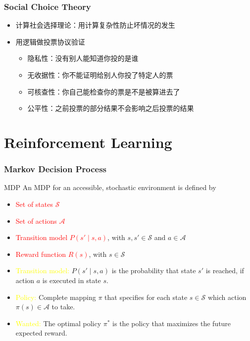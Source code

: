 \documentclass[UTF8,11pt,colorlinks,compress,openany]{beamer}%
\begin{document}
\begin{frame}\frametitle{Social Choice Theory}
\begin{itemize}
	\item 计算社会选择理论：用计算复杂性防止坏情况的发生
	\item 用逻辑做投票协议验证
		\begin{itemize}
			\item 隐私性：没有别人能知道你投的是谁
			\item 无收据性：你不能证明给别人你投了特定人的票
			\item 可核查性：你自己能检查你的票是不是被算进去了
			\item 公平性：之前投票的部分结果不会影响之后投票的结果
		\end{itemize}
\end{itemize}
\end{frame}

\section{Reinforcement Learning}

\begin{frame}\frametitle{Markov Decision Process}
\begin{block}{MDP}
An MDP for an accessible, stochastic environment is defined by
\begin{itemize}
	\item \textcolor{red}{Set of states $\mathcal{S}$}
	\item \textcolor{red}{Set of actions $\mathcal{A}$}
	\item \textcolor{red}{Transition model $P(s'\mid s,a)$}, with $s,s'\in \mathcal{S}$ and $a\in \mathcal{A}$
	\item \textcolor{red}{Reward function $R(s)$}, with $s \in \mathcal{S}$
\end{itemize}
\end{block}
\begin{itemize}
	\item \textcolor{yellow}{Transition model:} $P(s'\mid s,a)$ is the probability that state $s'$ is reached, if action $a$ is executed in state $s$.
	\item \textcolor{yellow}{Policy:} Complete mapping $\pi$ that specifies for each state $s\in \mathcal{S}$ which action $\pi(s)\in \mathcal{A}$ to take.
	\item \textcolor{yellow}{Wanted:} The optimal policy $\pi^*$ is the policy that maximizes the future expected reward.
\end{itemize}
\end{frame}
\end{document}
